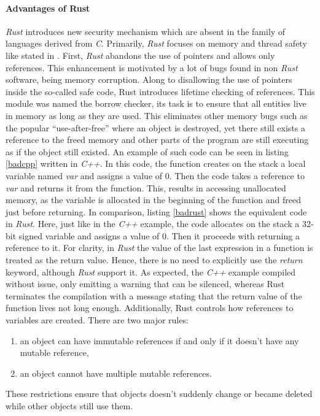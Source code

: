 \paragraph{Advantages of Rust}
\textit{Rust} introduces new security mechanism which are absent in the family of languages derived from \textit{C}. Primarily, \textit{Rust} focuses on memory and thread safety like stated in \cite{rustmemorysafety}. First, \textit{Rust} abandons the use of pointers and allows only references. This enhancement is motivated by a lot of bugs found in non \textit{Rust} software, being memory corruption. Along to disallowing the use of pointers inside the so-called safe code, Rust introduces lifetime checking of references. This module was named the borrow checker, its task is to ensure that all entities live in memory as long as they are used. This eliminates other memory bugs such as the popular “use-after-free” where an object is destroyed, yet there still exists a reference to the freed memory and other parts of the program are still executing as if the object still existed. An example of such code can be seen in listing \ref{badcpp} written in \textit{C++}. In this code, the function creates on the stack a local variable named \textit{var} and assigns a value of 0. Then the code takes a reference to \textit{var} and returns it from the function. This, results in accessing unallocated memory, as the variable is allocated in the beginning of the function and freed just before returning. In comparison, listing \ref{badrust} shows the equivalent code in \textit{Rust}. Here, just like in the \textit{C++} example, the code allocates on the stack a 32-bit signed variable and assigns a value of 0. Then it proceeds with returning a reference to it. For clarity, in \textit{Rust} the value of the last expression in a function is treated as the return value. Hence, there is no need to explicitly use the \textit{return} keyword, although \textit{Rust} support it. As expected, the \textit{C++} example compiled without issue, only emitting a warning that can be silenced, whereas Rust terminates the compilation with a message stating that the return value of the function lives not long enough. Additionally, Rust controls how references to variables are created. There are two major rules:
\begin{enumerate}
    \item an object can have immutable references if and only if it doesn't have any mutable reference,
    \item an object cannot have multiple mutable references.
\end{enumerate}
These restrictions ensure that objects doesn't suddenly change or became deleted while other objects still use them.

